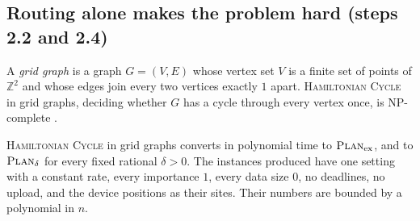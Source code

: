 \subsection{Routing alone makes the problem hard (steps 2.2 and 2.4)}
\label{sec:t1-routing}

A \emph{grid graph} is a graph $G=(V,E)$ whose vertex set $V$ is a finite
set of points of $\mathbb{Z}^2$ and whose edges join every two vertices
exactly $1$ apart. \textsc{Hamiltonian Cycle} in grid graphs, deciding
whether $G$ has a cycle through every vertex once, is NP-complete
\cite{ItaiPapadimitriouSzwarcfiter1982}.

\begin{lemma}[Routing]
\label{lem:routing}
\textsc{Hamiltonian Cycle} in grid graphs converts in polynomial time to
$\textsc{Plan}_{\mathrm{ex}}$, and to $\textsc{Plan}_\delta$ for every fixed rational
$\delta>0$. The instances produced have one setting with a constant rate,
every importance $1$, every data size $0$, no deadlines, no upload, and the
device positions as their sites. Their numbers are bounded by a polynomial
in $n$.
\end{lemma}

